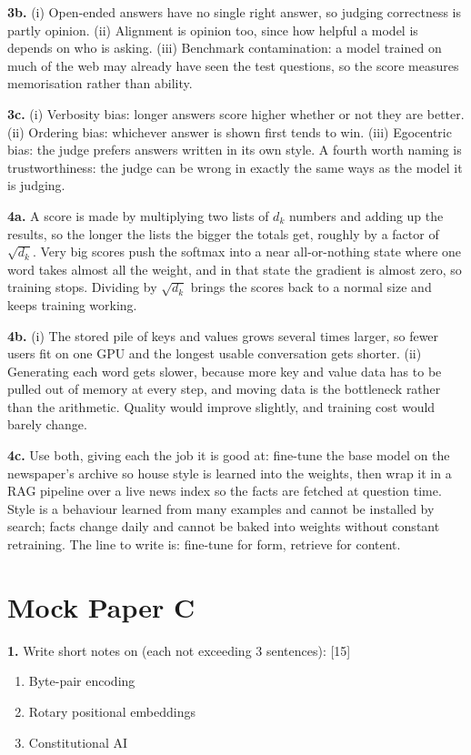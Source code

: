 \documentclass[11pt]{article}
\begin{document}
\textbf{3b.} (i) Open-ended answers have no single right answer, so judging correctness is
partly opinion. (ii) Alignment is opinion too, since how helpful a model is depends on who is
asking. (iii) Benchmark contamination: a model trained on much of the web may already have
seen the test questions, so the score measures memorisation rather than ability.

\textbf{3c.} (i) Verbosity bias: longer answers score higher whether or not they are better.
(ii) Ordering bias: whichever answer is shown first tends to win. (iii) Egocentric bias: the
judge prefers answers written in its own style. A fourth worth naming is trustworthiness: the
judge can be wrong in exactly the same ways as the model it is judging.

\textbf{4a.} A score is made by multiplying two lists of $d_k$ numbers and adding up the
results, so the longer the lists the bigger the totals get, roughly by a factor of
$\sqrt{d_k}$. Very big scores push the softmax into a near all-or-nothing state where one word
takes almost all the weight, and in that state the gradient is almost zero, so training stops.
Dividing by $\sqrt{d_k}$ brings the scores back to a normal size and keeps training working.

\textbf{4b.} (i) The stored pile of keys and values grows several times larger, so fewer users
fit on one GPU and the longest usable conversation gets shorter. (ii) Generating each word
gets slower, because more key and value data has to be pulled out of memory at every step, and
moving data is the bottleneck rather than the arithmetic. Quality would improve slightly, and
training cost would barely change.

\textbf{4c.} Use both, giving each the job it is good at: fine-tune the base model on the
newspaper's archive so house style is learned into the weights, then wrap it in a RAG pipeline
over a live news index so the facts are fetched at question time. Style is a behaviour learned
from many examples and cannot be installed by search; facts change daily and cannot be baked
into weights without constant retraining. The line to write is: fine-tune for form, retrieve
for content.

\section{Mock Paper C}

\textbf{1.} Write short notes on (each not exceeding 3 sentences): \hfill [15]
\begin{enumerate}[label=\alph*.]
  \item Byte-pair encoding
  \item Rotary positional embeddings
  \item Constitutional AI
\end{enumerate}
\end{document}

